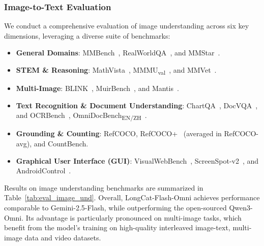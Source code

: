 \documentclass{article}
\begin{document}
\subsubsection{Image-to-Text Evaluation}
We conduct a comprehensive evaluation of image understanding across six key dimensions, leveraging a diverse suite of benchmarks:
\begin{itemize}
    \item \textbf{General Domains}: MMBench~\citep{liu2024mmbench}, RealWorldQA~\citep{realworldqa}, and MMStar~\citep{mmstar}.
    
    \item \textbf{STEM \& Reasoning}: MathVista~\citep{lu2024mathvista}, MMMU\textsubscript{val}~\citep{yue2023mmmu}, and MMVet~\citep{yu2024mmvet}.
    
    \item \textbf{Multi-Image}: BLINK~\citep{fu2024blink}, MuirBench~\citep{wang2024muirbench}, and Mantis~\citep{jiang2024mantis}.
    
    \item \textbf{Text Recognition \& Document Understanding}: ChartQA~\citep{masry2022chartqa}, DocVQA~\citep{mathew2021docvqa}, and OCRBench~\citep{liu2024ocrbench}, OmniDocBench\textsubscript{EN/ZH}~\citep{ouyang2024omnidocbench}.
    
    \item \textbf{Grounding \& Counting}: RefCOCO, RefCOCO+~\citep{kazemzadeh-2014-refcoco} (averaged in RefCOCO-avg), and CountBench\citep{paiss2023countbench}.
    
    \item \textbf{Graphical User Interface (GUI)}: VisualWebBench~\citep{liu2024visualwebbench}, ScreenSpot-v2~\citep{wu2024atlas}, and AndroidControl~\citep{li2024androidcontrol}.
\end{itemize}

Results on image understanding benchmarks are summarized in Table~\ref{tab:eval_image_und}. Overall, LongCat-Flash-Omni achieves performance comparable to Gemini-2.5-Flash, while outperforming the open-sourced Qwen3-Omni. Its advantage is particularly pronounced on multi-image tasks, which benefit from the model’s training on high-quality interleaved image-text, multi-image data and video datasets.
\end{document}
